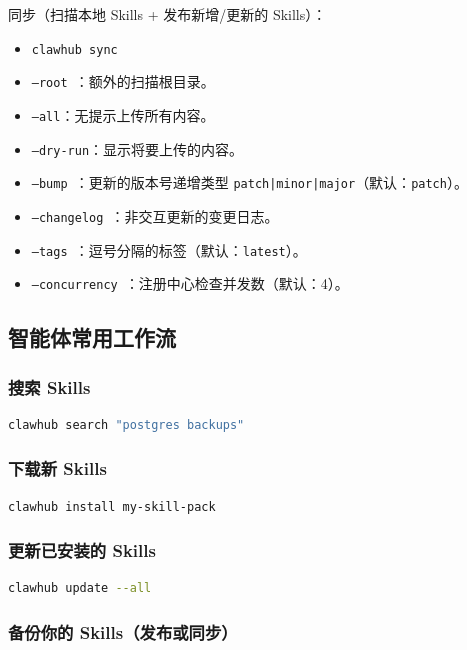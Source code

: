 同步（扫描本地 Skills + 发布新增/更新的 Skills）：

\begin{itemize}
  \item \texttt{clawhub sync}
  \item \texttt{--root }：额外的扫描根目录。
  \item \texttt{--all}：无提示上传所有内容。
  \item \texttt{--dry-run}：显示将要上传的内容。
  \item \texttt{--bump }：更新的版本号递增类型 \texttt{patch|minor|major}（默认：\texttt{patch}）。
  \item \texttt{--changelog }：非交互更新的变更日志。
  \item \texttt{--tags }：逗号分隔的标签（默认：\texttt{latest}）。
  \item \texttt{--concurrency }：注册中心检查并发数（默认：4）。
\end{itemize}


\subsection{智能体常用工作流}


\subsubsection{搜索 Skills}


\begin{lstlisting}[language=bash]
clawhub search "postgres backups"
\end{lstlisting}


\subsubsection{下载新 Skills}


\begin{lstlisting}[language=bash]
clawhub install my-skill-pack
\end{lstlisting}


\subsubsection{更新已安装的 Skills}


\begin{lstlisting}[language=bash]
clawhub update --all
\end{lstlisting}


\subsubsection{备份你的 Skills（发布或同步）}


